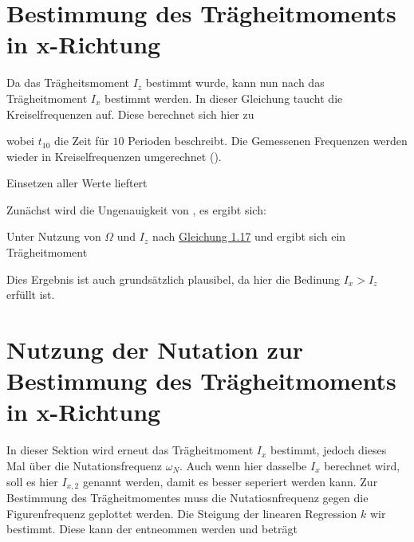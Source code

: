 \section{Bestimmung des Trägheitmoments in x-Richtung}
\label{sec:A5}
Da das Trägheitsmoment  $I_z$ bestimmt wurde, kann nun nach  das Trägheitmoment $I_x$ bestimmt werden. In dieser Gleichung taucht die Kreiselfrequenzen auf. Diese berechnet sich hier zu


wobei $t_{10}$ die Zeit für $10$ Perioden beschreibt. Die Gemessenen Frequenzen werden wieder in Kreiselfrequenzen umgerechnet ().


Einsetzen aller Werte lieftert 


Zunächst wird die Ungenauigkeit von , es ergibt sich:


Unter Nutzung von $\Omega$ und $I_z$ nach \hyperref[eq:res_i_z]{Gleichung 1.17} und  ergibt sich ein Trägheitmoment


Dies Ergebnis ist auch grundsätzlich plausibel, da hier die Bedinung $I_x > I_z$ erfüllt ist. 

\section{Nutzung der Nutation zur Bestimmung des Trägheitmoments in x-Richtung}
\label{sec:A6}
In dieser Sektion wird erneut das Trägheitmoment $I_x$ bestimmt, jedoch dieses Mal über die Nutationsfrequenz $\omega_N$. Auch wenn hier dasselbe $I_x$ berechnet wird, soll es hier $I_{x,2}$ genannt werden, damit es besser seperiert werden kann.
Zur Bestimmung des Trägheitmomentes muss die Nutatiosnfrequenz gegen die Figurenfrequenz geplottet werden. Die Steigung der linearen Regression $k$ wir bestimmt. Diese kann der  entneommen werden und beträgt

